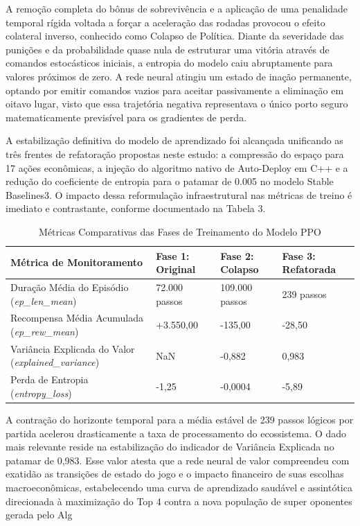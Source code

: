 \documentclass[12pt]{article}
\begin{document}
A remoção completa do bônus de sobrevivência e a aplicação de uma penalidade temporal rígida voltada a forçar a aceleração das rodadas provocou o efeito colateral inverso, conhecido como Colapso de Política. Diante da severidade das punições e da probabilidade quase nula de estruturar uma vitória através de comandos estocásticos iniciais, a entropia do modelo caiu abruptamente para valores próximos de zero. A rede neural atingiu um estado de inação permanente, optando por emitir comandos vazios para aceitar passivamente a eliminação em oitavo lugar, visto que essa trajetória negativa representava o único porto seguro matematicamente previsível para os gradientes de perda.

A estabilização definitiva do modelo de aprendizado foi alcançada unificando as três frentes de refatoração propostas neste estudo: a compressão do espaço para 17 ações econômicas, a injeção do algoritmo nativo de Auto-Deploy em C++ e a redução do coeficiente de entropia para o patamar de 0.005 no modelo Stable Baselines3. O impacto dessa reformulação infraestrutural nas métricas de treino é imediato e contrastante, conforme documentado na Tabela 3.

\begin{table}[h]
\centering
\caption{Métricas Comparativas das Fases de Treinamento do Modelo PPO}
\label{tab:comparativo}
\begin{tabular}{llll}
\hline
\textbf{Métrica de Monitoramento} & \textbf{Fase 1: Original} & \textbf{Fase 2: Colapso} & \textbf{Fase 3: Refatorada} \\ \hline
Duração Média do Episódio (\textit{ep\_len\_mean}) & 72.000 passos & 109.000 passos & 239 passos \\
Recompensa Média Acumulada (\textit{ep\_rew\_mean}) & +3.550,00 & -135,00 & -28,50 \\
Variância Explicada do Valor (\textit{explained\_variance}) & NaN & -0,882 & 0,983 \\
Perda de Entropia (\textit{entropy\_loss}) & -1,25 & -0,0004 & -5,89 \\ \hline
\end{tabular}
\end{table}

A contração do horizonte temporal para a média estável de 239 passos lógicos por partida acelerou drasticamente a taxa de processamento do ecossistema. O dado mais relevante reside na estabilização do indicador de Variância Explicada no patamar de 0,983. Esse valor atesta que a rede neural de valor compreendeu com exatidão as transições de estado do jogo e o impacto financeiro de suas escolhas macroeconômicas, estabelecendo uma curva de aprendizado saudável e assintótica direcionada à maximização do Top 4 contra a nova população de super oponentes gerada pelo Alg
\end{document}

